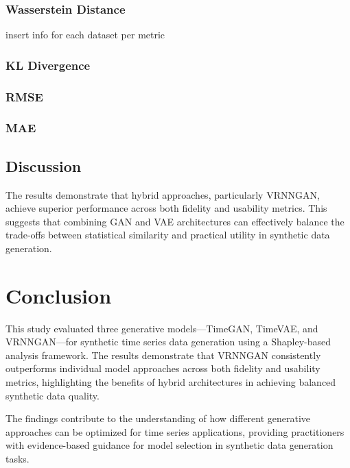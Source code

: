 \documentclass{article}
\begin{document}
\subsubsection{Wasserstein Distance}

insert info for each dataset per metric

\subsubsection{KL Divergence}
\subsubsection{RMSE}
\subsubsection{MAE}

\subsection{Discussion}
The results demonstrate that hybrid approaches, particularly VRNNGAN, achieve superior performance across both fidelity and usability metrics. This suggests that combining GAN and VAE architectures can effectively balance the trade-offs between statistical similarity and practical utility in synthetic data generation.

\section{Conclusion}

This study evaluated three generative models—TimeGAN, TimeVAE, and VRNNGAN—for synthetic time series data generation using a Shapley-based analysis framework. The results demonstrate that VRNNGAN consistently outperforms individual model approaches across both fidelity and usability metrics, highlighting the benefits of hybrid architectures in achieving balanced synthetic data quality.

The findings contribute to the understanding of how different generative approaches can be optimized for time series applications, providing practitioners with evidence-based guidance for model selection in synthetic data generation tasks.

\nocite{*}

\end{document}
